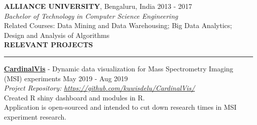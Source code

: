 \documentclass[a4paper]{article}
\newcommand{\myline}{\par
  \kern2pt %
  \hrule height 0.5pt
  \kern2pt %
}
\newcommand{\mybullet}{
	\indent 
  \textbullet \hspace*{2mm}
}
\begin{document}
 	\noindent
	\textbf{ALLIANCE UNIVERSITY}, Bengaluru, India \hfill 2013 - 2017 \\
	\textit{Bachelor of Technology in Computer Science Engineering} \\
  Related Courses: Data Mining and Data Warehousing; Big Data Analytics; Design and Analysis of Algorithms \\

	
	
\noindent
{\large \textbf{RELEVANT PROJECTS}}
\myline 
\smallskip

      \noindent
      \textbf{\href{https://github.com/kuwisdelu/CardinalVis/}{CardinalVis}} - 
      Dynamic data visualization for Mass Spectrometry Imaging (MSI) experiments 
      \hfill May 2019 - Aug 2019 \\
      \hfill \textit{Project Repository: \href{https://github.com/kuwisdelu/CardinalVis/}{https://github.com/kuwisdelu/CardinalVis/}}\\
      \mybullet Created R shiny dashboard and modules in R. \\
      \mybullet Application is open-sourced and intended to cut down research times in MSI experiment research. \\
\end{document}
